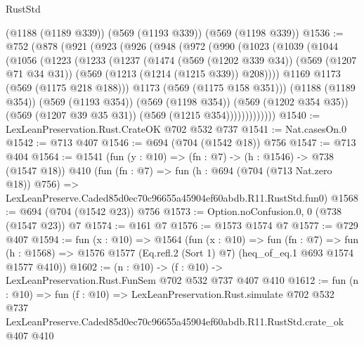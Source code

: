 \begin{lexlean}{RustStd}
\begin{coremodule}
    (@1188 (@1189 @339))
    (@569 (@1193 @339))
    (@569 (@1198 @339))
@1536 := @752
    (@878
      (@921
        (@923
          (@926
            (@948
              (@972
                (@990
                  (@1023
                    (@1039
                      (@1044
                        (@1056
                          (@1223
                            (@1233
                              (@1237
                                (@1474
                                  (@569 (@1202 @339 @34))
                                  (@569 (@1207 @71 @34 @31))
                                  (@569 (@1213 (@1214 (@1215 @339)) @208))))
                              @1169
                              @1173
                              (@569 (@1175 @218 @188)))
                            @1173
                            (@569 (@1175 @158 @351)))
                          (@1188 (@1189 @354))
                          (@569 (@1193 @354))
                          (@569 (@1198 @354))
                          (@569 (@1202 @354 @35))
                          (@569 (@1207 @39 @35 @31))
                          (@569 (@1215 @354)))))))))))))
@1540 := LexLeanPreservation.Rust.CrateOK @702 @532 @737
@1541 := Nat.casesOn.{0}
@1542 := @713 @407
@1546 := @694 (@704 (@1542 @18)) @756
@1547 := @713 @404
@1564 := @1541
    (fun (y : @10) => (fn : @7) -> (h : @1546) -> @738 (@1547 @18))
    @410
    (fun (fn : @7) =>
    fun (h : @694 (@704 (@713 Nat.zero @18)) @756) =>
    LexLeanPreserve.Caded85d0ec70c96655a45904ef60abdb.R11.RustStd.fun0)
@1568 := @694 (@704 (@1542 @23)) @756
@1573 := Option.noConfusion.{0, 0} (@738 (@1547 @23)) @7
@1574 := @161 @7
@1576 := @1573 @1574 @7
@1577 := @729 @407
@1594 := fun (x : @10) =>
  @1564
    (fun (x : @10) =>
    fun (fn : @7) =>
    fun (h : @1568) => @1576 @1577 (Eq.refl.{2} (Sort 1) @7) (heq_of_eq.{1} @693 @1574 @1577 @410))
@1602 := (n : @10) -> (f : @10) -> LexLeanPreservation.Rust.FunSem @702 @532 @737 @407 @410
@1612 := fun (n : @10) =>
  fun (f : @10) =>
  LexLeanPreservation.Rust.simulate
    @702
    @532
    @737
    LexLeanPreserve.Caded85d0ec70c96655a45904ef60abdb.R11.RustStd.crate_ok
    @407
    @410
\end{coremodule}
\end{lexlean}

